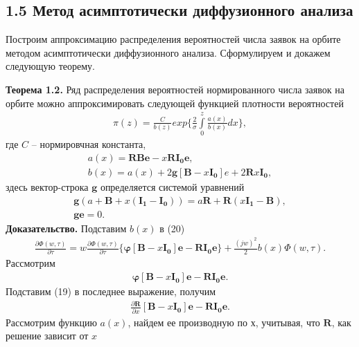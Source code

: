 \subsection{1.5 Метод асимптотически диффузионного анализа}
Построим аппроксимацию распределения вероятностей числа заявок на орбите методом асимптотически диффузионного анализа. Сформулируем и докажем следующую теорему.

\textbf{Теорема 1.2.} Ряд распределения вероятностей нормированного числа заявок на орбите можно аппроксимировать следующей функцией плотности вероятностей
\begin{align}
	\pi (z)= \frac{C}{b(z)}exp\bigg\{\frac{2}{\sigma} \int\limits_0^z \frac{a(x)}{b(x)}dx\bigg\},
\end{align} 
где $C$ -- нормировчная константа,
\begin{equation}
	\begin{split}
		a(x)=\boldsymbol{RBe}-x\boldsymbol{RI_{0}e},\\
		b(x)=a(x)+2\boldsymbol{g}[\boldsymbol{B}-x\boldsymbol{I_{0}}]e+2\boldsymbol{R}x\boldsymbol{I_{0}},
	\end{split}
\end{equation}
здесь вектор-строка $\boldsymbol{g}$ определяется системой уравнений
\begin{equation}
	\begin{split}
		\boldsymbol{g}(a+\boldsymbol{B}+x(\boldsymbol{I_{1}}-\boldsymbol{I_{0}}))=a\boldsymbol{R}+\boldsymbol{R}(x\boldsymbol{I_{1}}-\boldsymbol{B}),\\
		\boldsymbol{ge}=0.
	\end{split}
\end{equation}
\textbf{Доказательство.} Подставим $b(x)$ в (20)
\begin{align}
	\frac{\partial \Phi (w,\tau)}{\partial \tau}=w\frac{\partial \Phi (w,\tau)}{\partial \tau} \bigg\{\boldsymbol{\varphi}[\boldsymbol{B}-x\boldsymbol{I_{0}}] \boldsymbol{e}-\boldsymbol{RI_{0}e}\bigg\}+\frac{(jw)^2}{2}b(x)\Phi(w,\tau).
\end{align}
Рассмотрим
\begin{align*}
	\boldsymbol{\varphi}[\boldsymbol{B}-x\boldsymbol{I_{0}}] \boldsymbol{e}-\boldsymbol{RI_{0}e}.
\end{align*}
Подставим (19) в последнее выражение, получим
\begin{align}
	\frac{\partial \boldsymbol{R}}{\partial x}[\boldsymbol{B}-x\boldsymbol{I_{0}}] \boldsymbol{e}-\boldsymbol{RI_{0}e}.
\end{align}
Рассмотрим функцию $a(x)$, найдем ее производную по $х$, учитывая, что $\boldsymbol{R}$, как решение зависит от $x$
